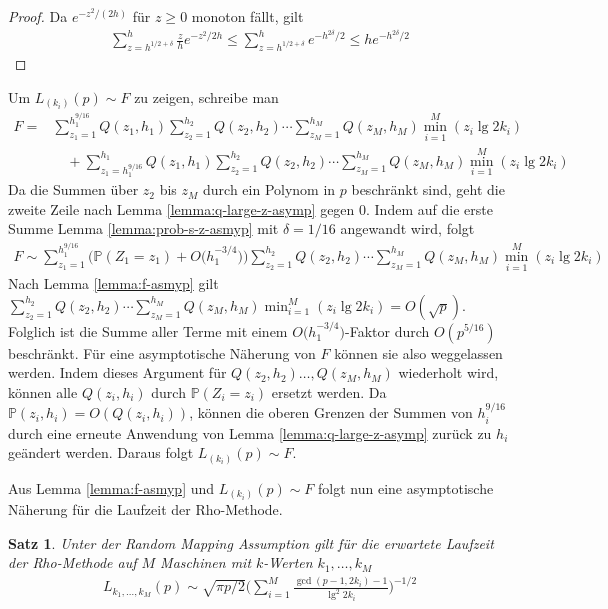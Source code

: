 \documentclass[a4paper, 11pt, ngerman]{article}
\renewcommand{\P}{\mathbb{P}}
\theoremstyle{definition}
\theoremstyle{plain}
\newtheorem{theorem}{Satz}
\theoremstyle{remark}
\begin{document}
\begin{proof}
    Da $e^{-z^2/(2h)}$ für $z \ge 0$ monoton fällt, gilt
    \begin{align*}
        \sum_{z = h^{1/2 + \delta}}^h \frac z h e^{-z^2/2h}
        \le \sum_{z = h^{1/2 + \delta}}^h e^{-h^{2\delta}/2}
        \le he^{-h^{2\delta}/2}
    \end{align*}
\end{proof}

Um $L_{(k_i)}(p) \sim F$ zu zeigen, schreibe man
\begin{align*}
    F = & \sum_{z_1 = 1}^{h_1^{9/16}} Q(z_1, h_1)
    \sum_{z_2 = 1}^{h_2} Q(z_2, h_2)    \cdots
    \sum_{z_M = 1}^{h_M} Q(z_M, h_M)
    \min_{i = 1}^M (z_i \lg 2k_i)                 \\
        & \quad +
    \sum_{z_1 = h_1^{9/16}}^{h_1} Q(z_1, h_1)
    \sum_{z_2 = 1}^{h_2} Q(z_2, h_2)    \cdots
    \sum_{z_M = 1}^{h_M} Q(z_M, h_M)
    \min_{i = 1}^M (z_i \lg 2k_i)
\end{align*}
Da die Summen über $z_2$ bis $z_M$ durch ein Polynom in $p$ beschränkt sind, geht die zweite Zeile nach Lemma \ref{lemma:q-large-z-asymp} gegen 0. Indem auf die erste Summe Lemma \ref{lemma:prob-s-z-asmyp} mit $\delta = 1/16$ angewandt wird, folgt
\begin{align*}
    F \sim \sum_{z_1 = 1}^{h_1^{9/16}}
    \Big ( \P(Z_1 = z_1) + O \Big ( h_1^{-3/4} \Big ) \Big )
    \sum_{z_2 = 1}^{h_2} Q(z_2, h_2)    \cdots
    \sum_{z_M = 1}^{h_M} Q(z_M, h_M)
    \min_{i = 1}^M (z_i \lg 2k_i)
\end{align*}
Nach Lemma \ref{lemma:f-asmyp} gilt $\sum_{z_2 = 1}^{h_2} Q(z_2, h_2) \cdots \sum_{z_M = 1}^{h_M} Q(z_M, h_M) \min_{i = 1}^M (z_i \lg 2k_i) = O(\sqrt p)$. Folglich ist die Summe aller Terme mit einem $O \big (h_1^{-3/4} \big )$-Faktor durch $O(p^{5/16})$ beschränkt. Für eine asymptotische Näherung von $F$ können sie also weggelassen werden. Indem dieses Argument für $Q(z_2, h_2) \dots, Q(z_M, h_M)$ wiederholt wird, können alle $Q(z_i, h_i)$ durch $\P(Z_i = z_i)$ ersetzt werden. Da $\P(z_i, h_i) = O(Q(z_i, h_i))$, können die oberen Grenzen der Summen von $h_i^{9/16}$ durch eine erneute Anwendung von Lemma \ref{lemma:q-large-z-asymp} zurück zu $h_i$ geändert werden. Daraus folgt $L_{(k_i)}(p) \sim F$.

Aus Lemma \ref{lemma:f-asmyp} und $L_{(k_i)}(p) \sim F$ folgt nun eine asymptotische Näherung für die Laufzeit der Rho-Methode.
\begin{theorem}
    Unter der Random Mapping Assumption gilt für die erwartete Laufzeit der Rho-Methode auf $M$ Maschinen mit $k$-Werten $k_1, \dots, k_M$
    \begin{align}
        L_{k_1, \dots, k_M}(p) \sim
        \sqrt{\pi p / 2} \Bigg ( \sum_{i = 1}^M
        \frac {\gcd(p - 1, 2k_i) - 1} {\lg^2 2k_i} \Bigg )^{-1/2}
        \label{eq:lki-asymp}
    \end{align}

    \label{theorem:lki-asymp}
\end{theorem}
\end{document}
